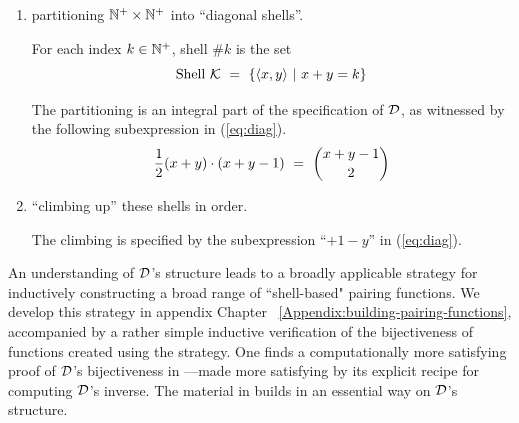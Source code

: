 \begin{enumerate}
\item
partitioning $\mathbb{N}^+ \times \mathbb{N}^+$ into ``diagonal shells''.

\smallskip

For each index $k \in \mathbb{N}^+$, shell \#$k$ is the set
\[ \mbox{Shell } \mbox{$\cal K$} \ = \ \{ \langle x,y \rangle \ | \ x+y = k \} \]

\smallskip

The partitioning is an integral part of the specification of $\mbox{$\cal D$}$, as witnessed by the following subexpression in (\ref{eq:diag}).
\[
{1 \over 2} (x+y) \cdot (x+y-1) \ = \ {{x+y-1} \choose 2}
\]

\item
``climbing up'' these shells in order.

\smallskip

The climbing is specified by the subexpression ``$+1-y$'' in (\ref{eq:diag}).
\end{enumerate}
\bigskip

\noindent {}

\bigskip

An understanding of $\mbox{$\cal D$}$'s structure leads to a broadly applicable strategy for inductively constructing a broad range of ``shell-based" pairing functions.  We develop this strategy in appendix Chapter ~\ref{Appendix:building-pairing-functions}, accompanied by a rather simple inductive verification of the bijectiveness of functions created using the strategy.  One finds a computationally more satisfying proof of $\mbox{$\cal D$}$'s bijectiveness in \cite{Davis58}---made more satisfying by its explicit recipe for computing $\mbox{$\cal D$}$'s inverse.  The material in \cite{Davis58} builds in an essential way on $\mbox{$\cal D$}$'s structure.

\bigskip

